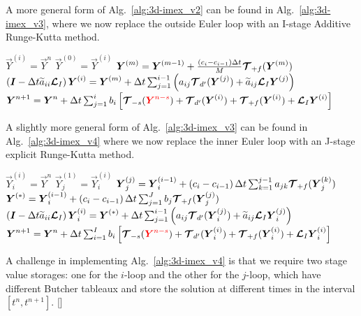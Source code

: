 \documentclass{report}
\begin{document}
A more general form of Alg.\ \ref{alg:3d-imex_v2} can be found in Alg.\ \ref{alg:3d-imex_v3}, where we now replace the outside Euler loop with an I-stage Additive Runge-Kutta method. 
\begin{algorithm}
\label{alg:3d-imex_v3}
\begin{algorithmic}
\State
{}
\State $\vec{Y}^{(i)}=\vec{Y}^{n}$
\State $\vec{Y}^{(0)}=\vec{Y}^{(i)}$
\State $\boldsymbol{{Y}}^{(m)}=\boldsymbol{{Y}}^{(m-1)} + \frac{\left(c_i - c_{i-1} \right) \Delta t}{M} \boldsymbol{{\mathcal{T}}}_{+f}(\boldsymbol{{Y}}^{(m)})$
\EndFor %
\State $\left( \boldsymbol{{I}} - \Delta t \widetilde{a}_{ii} \boldsymbol{{\mathcal{L}}}_I \right) \boldsymbol{{Y}}^{(i)}=\boldsymbol{{Y}}^{(m)} + \Delta t \sum_{j=1}^{i-1} \left( a_{ij} \boldsymbol{{\mathcal{T}}}_{d'}(\boldsymbol{{Y}}^{(j)}) + \widetilde{a}_{ij} \boldsymbol{{\mathcal{L}}}_I \boldsymbol{{Y}}^{(j)} \right)$
\EndFor %
\State $\boldsymbol{{Y}}^{n+1}=\boldsymbol{{Y}}^{n} + \Delta t \sum_{j=1}^{i} b_i \left[ \boldsymbol{{\mathcal{T}}}_{-s}(\textcolor{red}{\boldsymbol{{Y}}^{n-s}}) + \boldsymbol{{\mathcal{T}}}_{d'}(\boldsymbol{{Y}}^{(i)}) + 
\boldsymbol{{\mathcal{T}}}_{+f}(\boldsymbol{{Y}}^{(i)}) + 
\boldsymbol{{\mathcal{L}}}_I \boldsymbol{{Y}}^{(i)} \right]$
\EndFunction
\end{algorithmic}
\end{algorithm}

A slightly more general form of Alg.\ \ref{alg:3d-imex_v3} can be found in Alg.\ \ref{alg:3d-imex_v4} where we now replace the inner Euler loop with an J-stage explicit Runge-Kutta method. 
\begin{algorithm}
\label{alg:3d-imex_v4}
\begin{algorithmic}
\State
{}
\State $\vec{Y}_i^{(i)}=\vec{Y}^{n}$
\State $\vec{Y}_j^{(1)}=\vec{Y}_i^{(i)}$
\State $\boldsymbol{{Y}}_j^{(j)}=\boldsymbol{{Y}}_i^{(i-1)} + \left(c_i - c_{i-1} \right) \Delta t \sum_{k=1}^{j-1} a_{jk} \boldsymbol{{\mathcal{T}}}_{+f}(\boldsymbol{{Y}}_j^{(k)})$
\EndFor %
\State $\boldsymbol{{Y}}^{(*)}=\boldsymbol{{Y}}_i^{(i-1)} + \left(c_i - c_{i-1} \right) \Delta t \sum_{j=1}^{J} b_j \boldsymbol{{\mathcal{T}}}_{+f}(\boldsymbol{{Y}}_j^{(j)})$
\State $\left( \boldsymbol{{I}} - \Delta t \widetilde{a}_{ii} \boldsymbol{{\mathcal{L}}}_I \right) \boldsymbol{{Y}}_i^{(i)}=\boldsymbol{{Y}}^{(*)} + \Delta t \sum_{j=1}^{i-1} \left( a_{ij} \boldsymbol{{\mathcal{T}}}_{d'}(\boldsymbol{{Y}}_i^{(j)}) + \widetilde{a}_{ij} \boldsymbol{{\mathcal{L}}}_I \boldsymbol{{Y}}_i^{(j)} \right)$
\EndFor %
\State $\boldsymbol{{Y}}^{n+1}=\boldsymbol{{Y}}^{n} + \Delta t \sum_{i=1}^{I} b_i \left[ \boldsymbol{{\mathcal{T}}}_{-s}(\textcolor{red}{\boldsymbol{{Y}}^{n-s}}) + \boldsymbol{{\mathcal{T}}}_{d'}(\boldsymbol{{Y}}_i^{(i)}) + 
\boldsymbol{{\mathcal{T}}}_{+f}(\boldsymbol{{Y}}_i^{(i)}) + 
\boldsymbol{{\mathcal{L}}}_I \boldsymbol{{Y}}_i^{(i)} \right]$
\EndFunction
\end{algorithmic}
\end{algorithm}
A challenge in implementing Alg.\ \ref{alg:3d-imex_v4} is that we require two stage value storages: one for the $i$-loop and the other for the $j$-loop, which have different Butcher tableaux and store the solution at different times in the interval $[t^n,t^{n+1}]$.
[]
\end{document}
